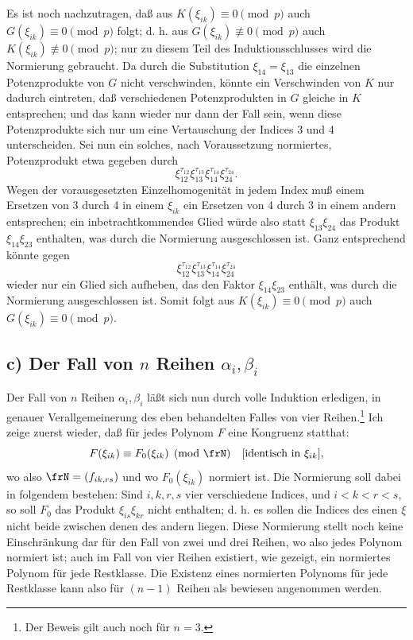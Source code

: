 \documentclass[11pt]{article}
\begin{document}
Es ist noch nachzutragen, daß aus \(K(\xi_{ik})\equiv0\pmod p\) auch \(G(\xi_{ik})\equiv0\pmod p\) folgt; d. h. aus \(G(\xi_{ik})\not\equiv0\pmod p\) auch \(K(\xi_{ik})\not\equiv0\pmod p\); nur zu diesem Teil des Induktionsschlusses wird die Normierung gebraucht. Da durch die Substitution \(\xi_{14}=\xi_{13}\) die einzelnen Potenzprodukte von \(G\) nicht verschwinden, könnte ein Verschwinden von \(K\) nur dadurch eintreten, daß verschiedenen Potenzprodukten in \(G\) gleiche in \(K\) entsprechen; und das kann wieder nur dann der Fall sein, wenn diese Potenzprodukte sich nur um eine Vertauschung der Indices 3 und 4 unterscheiden. Sei nun ein solches, nach Voraussetzung normiertes, Potenzprodukt etwa gegeben durch
\[
        \xi_{12}^{\tau_{12}}\xi_{13}^{\tau_{13}}\xi_{14}^{\tau_{14}}\xi_{24}^{\tau_{24}}.
\]
Wegen der vorausgesetzten Einzelhomogenität in jedem Index muß einem Ersetzen von 3 durch 4 in einem \(\xi_{ik}\) ein Ersetzen von 4 durch 3 in einem andern entsprechen; ein inbetrachtkommendes Glied würde also statt \(\xi_{13}\xi_{24}\) das Produkt \(\xi_{14}\xi_{23}\) enthalten, was durch die Normierung ausgeschlossen ist. Ganz entsprechend könnte gegen
\[
        \xi_{12}^{\tau_{12}}\xi_{13}^{\tau_{13}}\xi_{14}^{\tau_{14}}\xi_{24}^{\tau_{24}}
\]
wieder nur ein Glied sich aufheben, das den Faktor \(\xi_{14}\xi_{23}\) enthält, was durch die Normierung ausgeschlossen ist. Somit folgt aus \(K(\xi_{ik})\equiv0\pmod p\) auch \(G(\xi_{ik})\equiv0\pmod p\).

\subsection*{c) Der Fall von \(n\) Reihen \(\alpha_i,\beta_i\)}

Der Fall von \(n\) Reihen \(\alpha_i,\beta_i\) läßt sich nun durch volle Induktion erledigen, in genauer Verallgemeinerung des eben behandelten Falles von vier Reihen.\footnote{Der Beweis gilt auch noch für \(n=3\).}
Ich zeige zuerst wieder, daß für jedes Polynom \(F\) eine Kongruenz statthat:
\begin{equation}
        F(\xi_{ik})\equiv F_0(\xi_{ik})\pmod{\frN}\quad [\text{identisch in \(\xi_{ik}\)}],
\end{equation}
wo also \(\frN=(f_{ik,rs})\) und wo \(F_0(\xi_{ik})\) normiert ist. Die Normierung soll dabei in folgendem bestehen: Sind \(i,k,r,s\) vier verschiedene Indices, und \(i<k<r<s\), so soll \(F_0\) das Produkt \(\xi_{is}\xi_{kr}\) nicht enthalten; d. h. es sollen die Indices des einen \(\xi\) nicht beide zwischen denen des andern liegen. Diese Normierung stellt noch keine Einschränkung dar für den Fall von zwei und drei Reihen, wo also jedes Polynom normiert ist; auch im Fall von vier Reihen existiert, wie gezeigt, ein normiertes Polynom für jede Restklasse. Die Existenz eines normierten Polynoms für jede Restklasse kann also für \((n-1)\) Reihen als bewiesen angenommen werden.
\end{document}
